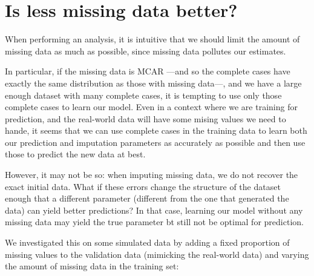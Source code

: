 	\section{Is less missing data better?}
When performing an analysis, it is intuitive that we should limit the amount of missing data as much as possible, since missing data pollutes our estimates.

In particular, if the missing data is MCAR ---and so the complete cases have exactly the same distribution as those with missing data---, and we have a large enough dataset with many complete cases, it is tempting to use only those complete cases to learn our model. Even in a context where we are training for prediction, and the real-world data will have some mising values we need to hande, it seems that we can use complete cases in the training data to learn both our prediction and imputation parameters as accurately as possible and then use those to predict the new data at best.

However, it may not be so: when imputing missing data, we do not recover the exact initial data. What if these errors change the structure of the dataset enough that a different parameter (different from the one that generated the data) can yield better predictions? In that case, learning our model without any missing data may yield the true parameter bt still not be optimal for prediction.

We investigated this on some simulated data by adding a fixed proportion of missing values to the validation data (mimicking the real-world data) and varying the amount of missing data in the training set:

